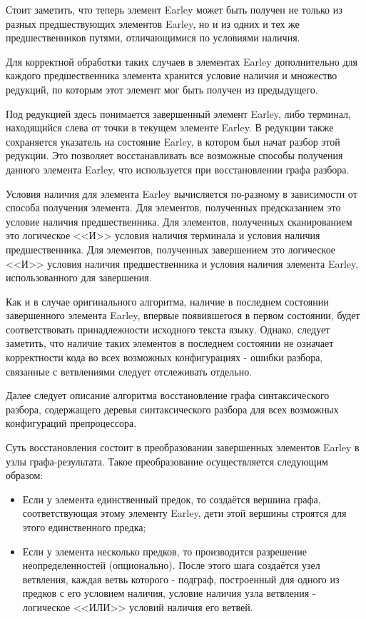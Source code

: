 Стоит заметить, что теперь элемент Earley может быть получен не только из разных предшествующих элементов Earley, но и из одних и тех же предшественников путями, отличающимися по условиями наличия.

Для корректной обработки таких случаев в элементах Earley дополнительно для каждого предшественника элемента хранится условие наличия и множество редукций, по которым этот элемент мог быть получен из предыдущего.

Под редукцией здесь понимается завершенный элемент Earley, либо терминал, находящийся слева от точки в текущем элементе Earley. В редукции также сохраняется указатель на состояние Earley, в котором был начат разбор этой редукции. Это позволяет восстанавливать все возможные способы получения данного элемента Earley, что используется при восстановлении графа разбора.

Условия наличия для элемента Earley вычисляется по-разному в зависимости от способа получения элемента. Для элементов, полученных предсказанием это условие наличия предшественника. Для элементов, полученных сканированием это логическое <<И>> условия наличия терминала и условия наличия предшественника. Для элементов, полученных завершением это логическое <<И>> условия наличия предшественника и условия наличия элемента Earley, использованного для завершения.

Как и в случае оригинального алгоритма, наличие в последнем состоянии завершенного элемента Earley, впервые появившегося в первом состоянии, будет соответствовать принадлежности исходного текста языку. Однако, следует заметить, что наличие таких элементов в последнем состоянии не означает корректности кода во всех возможных конфигурациях - ошибки разбора, связанные с ветвлениями следует отслеживать отдельно.

Далее следует описание алгоритма восстановление графа синтаксического разбора, содержащего деревья синтаксического разбора для всех возможных конфигураций препроцессора.

Суть восстановления состоит в преобразовании завершенных элементов Earley в узлы графа-результата. Такое преобразование осуществляется следующим образом:

\begin{itemize}
\item Если у элемента единственный предок, то создаётся вершина графа, соответствующая этому элементу Earley, дети этой вершины строятся для этого единственного предка;
\item Если у элемента несколько предков, то производится разрешение неопределенностей (опционально). После этого шага создаётся узел ветвления, каждая ветвь которого - подграф, построенный для одного из предков с его условием наличия, условие наличия узла ветвления - логическое <<ИЛИ>> условий наличия его ветвей.
\end{itemize}

